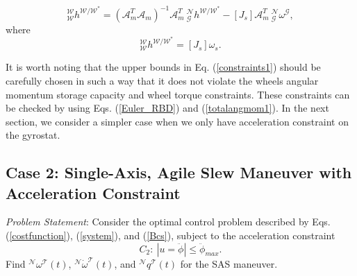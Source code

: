 \documentclass[journal ]{new-aiaa}
\begin{document}
\begin{equation}\label{totalangmom1}
_\mathcal{W}^\mathcal{W}h^{\mathcal{W}/\mathcal{W}^*}=(\mathcal{A}_m^T\mathcal{A}_m)^{-1}\mathcal{A}_m^T\ _\mathcal{G}^\mathcal{N}h^{\mathcal{W}/\mathcal{W}^*}-[ J_{s}]\mathcal{A}_m^T\  _\mathcal{G}^\mathcal{N}\omega^{\mathcal{G}},
\end{equation}
where
\begin{equation}\label{totalangmom2}
_\mathcal{W}^\mathcal{W}h^{\mathcal{W}/\mathcal{W}^*}=[ J_{s}] \omega_{s}.
\end{equation}

It is worth noting that the upper bounds in Eq. (\ref{constraints1}) should be carefully chosen in such a way that it  does not violate the wheels angular momentum storage capacity and wheel torque constraints. These constraints can be checked by using Eqs. (\ref{Euler_RBD}) and (\ref{totalangmom1}).
In the next section, we consider a simpler case when we only have acceleration constraint on the gyrostat.%
	
	\subsection{Case 2: Single-Axis, Agile Slew Maneuver with Acceleration Constraint} 
	
	{\it Problem Statement}: Consider the optimal control problem described by Eqs. (\ref{costfunction}), (\ref{system}), and (\ref{Bcs}), subject to the acceleration constraint
	\begin{equation}
	C_2: \ |u=\ddot{\phi}|\leq \ddot{\phi}_{max}.
	\end{equation}
	Find $^\mathcal{N}\omega^\mathcal{T}(t)$, $^\mathcal{N}\dot{\omega}^\mathcal{T}(t)$, and $^\mathcal{N}q^\mathcal{T}(t)$ for the SAS maneuver.
	
\end{document}
